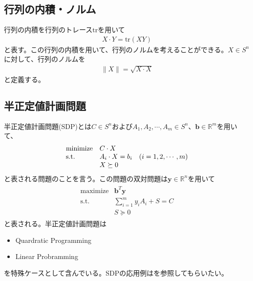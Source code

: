 \subsection{行列の内積・ノルム}
行列の内積を行列のトレース$\mathrm{tr}$を用いて
\begin{align*}
  X \cdot Y = \mathrm{tr}\left(X Y\right)
\end{align*}
と表す。この行列の内積を用いて、行列のノルムを考えることができる。$X \in S^n$に対して、行列のノルムを
\begin{align*}
  \|X\| = \sqrt{X \cdot X}
\end{align*}
と定義する。

\subsection{半正定値計画問題}
半正定値計画問題(SDP)とは$C \in S^n$および$A_1, A_2, \cdots, A_m \in S^n$、$\mathbf{b} \in \mathbb{R}^m$を用いて、
\begin{align} \label{MainProblem}
  \begin{array}{lll}
    \mathrm{minimize} & C \cdot X \\
    \mathrm{s.t.}     & A_i \cdot X = b_i & \parenthesis(i = 1, 2, \cdots, m) \\
                      & X \succeq 0
  \end{array}
\end{align}
と表される問題のことを言う。この問題の双対問題は$\mathbf{y} \in \mathbb{R}^n$を用いて
\begin{align} \label{DualProblem}
  \begin{array}{lll}
    \mathrm{maximize} & \mathbf{b}^T \mathbf{y} \\
    \mathrm{s.t.}     & \displaystyle{\sum_{i = 1}^m} y_i A_i + S = C \\
                      & S \succeq 0
  \end{array}
\end{align}
と表される。半正定値計画問題は
\begin{itemize}
  \item Quardratic Programming
  \item Linear Probramming
\end{itemize}
を特殊ケースとして含んでいる。SDPの応用例は\cite{Applications}を参照してもらいたい。

